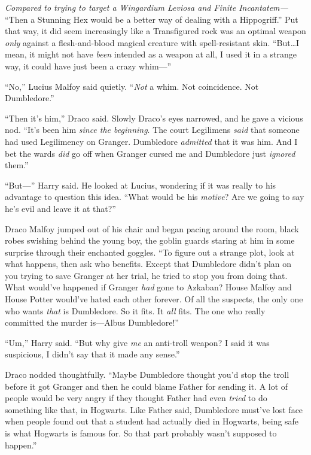 \emph{Compared to trying to target a Wingardium Leviosa and Finite Incantatem—} “Then a Stunning Hex would be a better way of dealing with a Hippogriff.” Put that way, it did seem increasingly like a Transfigured rock was an optimal weapon \emph{only} against a flesh-and-blood magical creature with spell-resistant skin. “But…I mean, it might not have \emph{been} intended as a weapon at all, I used it in a strange way, it could have just been a crazy whim—”

“No,” Lucius Malfoy said quietly. “\emph{Not} a whim. Not coincidence. Not Dumbledore.”

“Then it’s him,” Draco said. Slowly Draco’s eyes narrowed, and he gave a vicious nod. “It’s been him \emph{since the beginning}. The court Legilimens \emph{said} that someone had used Legilimency on Granger. Dumbledore \emph{admitted} that it was him. And I bet the wards \emph{did} go off when Granger cursed me and Dumbledore just \emph{ignored} them.”

“But—” Harry said. He looked at Lucius, wondering if it was really to his advantage to question this idea. “What would be his \emph{motive}? Are we going to say he’s evil and leave it at that?”

Draco Malfoy jumped out of his chair and began pacing around the room, black robes swishing behind the young boy, the goblin guards staring at him in some surprise through their enchanted goggles. “To figure out a strange plot, look at what happens, then ask who benefits. Except that Dumbledore didn’t plan on you trying to save Granger at her trial, he tried to stop you from doing that. What would’ve happened if Granger \emph{had} gone to Azkaban? House Malfoy and House Potter would’ve hated each other forever. Of all the suspects, the only one who wants \emph{that} is Dumbledore. So it fits. It \emph{all} fits. The one who really committed the murder is—Albus Dumbledore!”

“Um,” Harry said. “But why give \emph{me} an anti-troll weapon? I said it was suspicious, I didn’t say that it made any sense.”

Draco nodded thoughtfully. “Maybe Dumbledore thought you’d stop the troll before it got Granger and then he could blame Father for sending it. A lot of people would be very angry if they thought Father had even \emph{tried} to do something like that, in Hogwarts. Like Father said, Dumbledore must’ve lost face when people found out that a student had actually died in Hogwarts, being safe is what Hogwarts is famous for. So that part probably wasn’t supposed to happen.”

